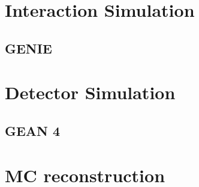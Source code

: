 \section{Interaction Simulation}
\label{Cap:Simulation:InteractionSimulation}

\subsection{GENIE}
\label{Cap:Simulation:GENIE}

\section{Detector Simulation}
\label{Cap:Simulation:DetectorSimulation}

\subsection{GEAN 4}
\label{Cap:Simulation:GEANT4}

\section{MC reconstruction}
\label{Cap:Simulation:MCReconstruction}




